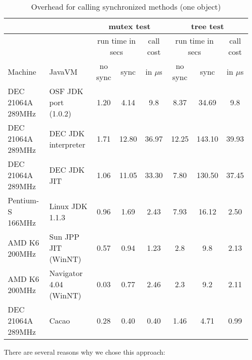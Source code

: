 \begin{table*}
\begin{center}
\begin{tabular}{|l|l|c|c|c|c|c|c|} \hline
                  &                     & \multicolumn{3}{|c|}{mutex test}
                                        & \multicolumn{3}{|c|}{tree test}\\ \hline
                  &                     & \multicolumn{2}{|c|}{run time in secs}&call cost
                                        & \multicolumn{2}{|c|}{run time in secs}&call cost\\
Machine           & JavaVM              & no sync & sync  & in $\mu$s & no sync & sync   & in $\mu$s \\ \hline\hline
DEC 21064A 289MHz & OSF JDK port (1.0.2)&  1.20   & 4.14  &   9.8     &  8.37   & 34.69  & 9.8    \\ \hline
DEC 21064A 289MHz & DEC JDK interpreter &  1.71   & 12.80 &   36.97   &  12.25  & 143.10 & 39.93  \\ \hline
DEC 21064A 289MHz & DEC JDK JIT         &  1.06   & 11.05 &   33.30   &  7.80   & 130.50 & 37.45  \\ \hline
Pentium-S 166MHz  & Linux JDK 1.1.3     &  0.96   & 1.69  &   2.43    &  7.93   & 16.12  & 2.50   \\ \hline
AMD K6 200MHz     & Sun JPP JIT (WinNT) &  0.57   & 0.94  &   1.23    &  2.8    & 9.8    & 2.13   \\ \hline
AMD K6 200MHz     & Navigator 4.04 (WinNT) & 0.03 & 0.77  &   2.46    &  2.3    & 9.2    & 2.11   \\ \hline
DEC 21064A 289MHz & Cacao               &  0.28   & 0.40  &  0.40     &  1.46   & 4.71   & 0.99   \\ \hline
\end{tabular}
\caption{Overhead for calling synchronized methods (one object)}
\label{SyncronizedOverhead}
\end{center}
\end{table*}

There are several reasons why we chose this approach:

